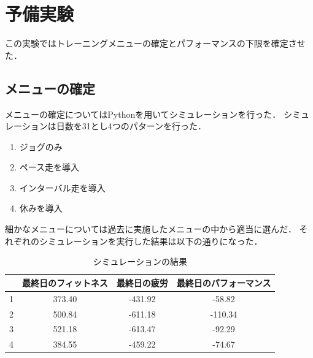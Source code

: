 \documentclass[12pt,fleqn]{jreport}
\begin{document}
\section{予備実験}
この実験ではトレーニングメニューの確定とパフォーマンスの下限を確定させた．
\subsection{メニューの確定}
メニューの確定についてはPythonを用いてシミュレーションを行った．
シミュレーションは日数を31とし4つのパターンを行った．
\begin{enumerate}
  \item ジョグのみ
  \item ペース走を導入
  \item インターバル走を導入
  \item 休みを導入
\end{enumerate}
細かなメニューについては過去に実施したメニューの中から適当に選んだ．
それぞれのシミュレーションを実行した結果は以下の通りになった．
\begin{table}[H]
  \caption{シミュレーションの結果}
  \begin{center}
    \begin{tabular}{|c|c|c|c|}
      \hline
        & 最終日のフィットネス & 最終日の疲労 & 最終日のパフォーマンス \\
      \hline
      1 & 373.40               & -431.92      & -58.82                 \\
      \hline
      2 & 500.84               & -611.18      & -110.34                \\
      \hline
      3 & 521.18               & -613.47      & -92.29                 \\
      \hline
      4 & 384.55               & -459.22      & -74.67                 \\
      \hline
    \end{tabular}
  \end{center}
\end{table}
\end{document}
